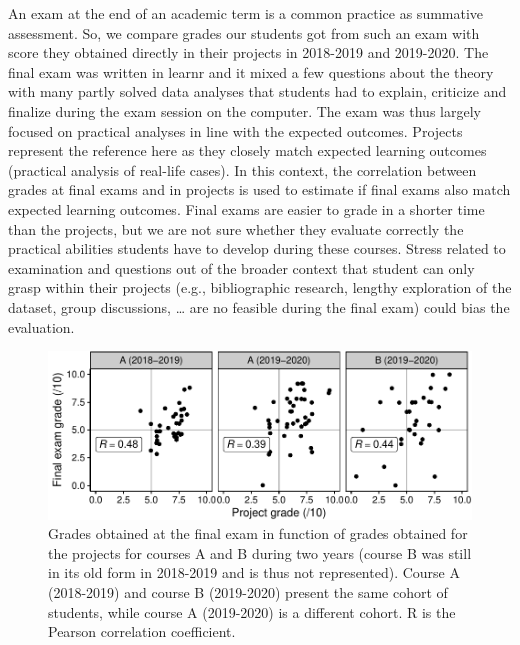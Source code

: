 \documentclass{aims}
\theoremstyle{definition}
\begin{document}
An exam at the end of an academic term is a common practice as summative
assessment. So, we compare grades our students got from such an exam
with score they obtained directly in their projects in 2018-2019 and
2019-2020. The final exam was written in learnr and it mixed a few
questions about the theory with many partly solved data analyses that
students had to explain, criticize and finalize during the exam session
on the computer. The exam was thus largely focused on practical analyses
in line with the expected outcomes. Projects represent the reference
here as they closely match expected learning outcomes (practical
analysis of real-life cases). In this context, the correlation between
grades at final exams and in projects is used to estimate if final exams
also match expected learning outcomes. Final exams are easier to grade
in a shorter time than the projects, but we are not sure whether they
evaluate correctly the practical abilities students have to develop
during these courses. Stress related to examination and questions out of
the broader context that student can only grasp within their projects
(e.g., bibliographic research, lengthy exploration of the dataset, group
discussions, \ldots{} are no feasible during the final exam) could bias
the evaluation.

\begin{figure}
\includegraphics[width=1\linewidth]{teaching_data_science_files/figure-latex/fig_exams_projects-1} \caption{\label{fig:fig_exams_projects}  Grades obtained at the final exam in function of grades obtained for the projects for courses A and B during two years (course B was still in its old form in 2018-2019 and is thus not represented). Course A (2018-2019) and course B (2019-2020) present the same cohort of students, while course A (2019-2020) is a different cohort. R is the Pearson correlation coefficient.}\label{fig:fig_exams_projects}
\end{figure}
\end{document}

